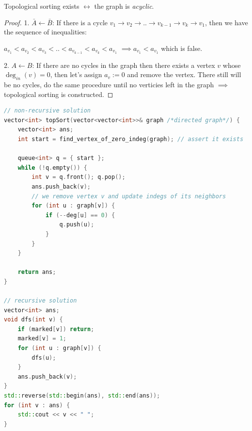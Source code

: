 \begin{lemma}
    Topological sorting exists $\leftrightarrow$ the graph is \textit{acyclic}.
\end{lemma}

\begin{proof}

    1. \textbf{$\bar{A} \leftarrow \bar{B}$}: If there is a cycle $v_1 \to v_2 \to .. \to v_{k-1} \to v_k \to v_1$, then we have the sequence of inequalities:

    $a_{v_1} < a_{v_2} < a_{v_3} < .. < a_{v_{k-1}} < a_{v_k} < a_{v_1}$ $\implies a_{v_1} < a_{v_1}$ which is false.

    2. \textbf{$A \leftarrow B$}: If there are no cycles in the graph then there exists a vertex $v$ whose $\deg_{in}(v) = 0$, then let's assign $a_{v} := 0$ and remove the vertex. There still will be no cycles, do the same procedure until no verticies left in the graph $\implies$ topological sorting is constructed.

\end{proof}

\begin{lstlisting}[language=C++]
// non-recursive solution
vector<int> topSort(vector<vector<int>>& graph /*directed graph*/) {
    vector<int> ans;
    int start = find_vertex_of_zero_indeg(graph); // assert it exists

    queue<int> q = { start };
    while (!q.empty()) {
        int v = q.front(); q.pop();
        ans.push_back(v);
        // we remove vertex v and update indegs of its neighbors
        for (int u : graph[v]) {
            if (--deg[u] == 0) {
                q.push(u);
            }
        }
    }

    return ans;
}

// recursive solution
vector<int> ans;
void dfs(int v) {
    if (marked[v]) return;
    marked[v] = 1;
    for (int u : graph[v]) {
        dfs(u);
    }
    ans.push_back(v);
}
std::reverse(std::begin(ans), std::end(ans));
for (int v : ans) {
    std::cout << v << " ";
}
\end{lstlisting}
